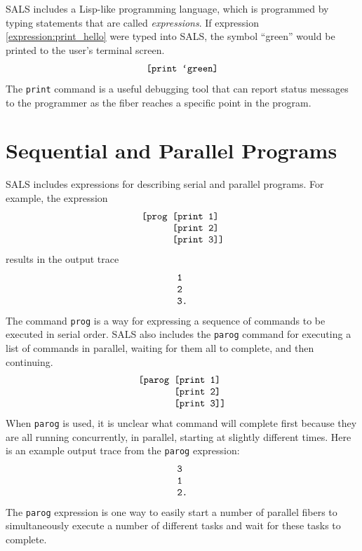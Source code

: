 SALS includes a Lisp-like programming language, which is programmed
by typing statements that are called \emph{expressions}.  If
expression \ref{expression:print_hello} were typed into SALS, the
symbol ``green'' would be printed to the user's terminal screen.
\begin{equation}
\label{expression:print_hello}
\text{\tt [print `green]}
\end{equation}
The {\tt print} command is a useful debugging tool that can report
status messages to the programmer as the fiber reaches a specific
point in the program.

\section{Sequential and Parallel Programs}

SALS includes expressions for describing serial and parallel
programs.  For example, the expression
\begin{equation*}
\begin{array}{l}
\text{\tt [prog [print 1]} \\
\text{\tt ~~~~~~[print 2]} \\
\text{\tt ~~~~~~[print 3]]}
\end{array}
\end{equation*}
results in the output trace
\begin{equation*}
\begin{array}{l}
\text{\tt 1} \\
\text{\tt 2} \\
\text{\tt 3.}
\end{array}
\end{equation*}
The command {\tt prog} is a way for expressing a sequence of commands
to be executed in serial order.  SALS also includes the {\tt parog}
command for executing a list of commands in parallel, waiting for them
all to complete, and then continuing.
\begin{equation*}
\begin{array}{l}
\text{\tt [parog [print 1]} \\
\text{\tt ~~~~~~~[print 2]} \\
\text{\tt ~~~~~~~[print 3]]}
\end{array}
\end{equation*}
When {\tt parog} is used, it is unclear what command will complete
first because they are all running concurrently, in parallel, starting
at slightly different times.  Here is an example output trace from the
{\tt parog} expression:
\begin{equation*}
\begin{array}{l}
\text{\tt 3} \\
\text{\tt 1} \\
\text{\tt 2.}
\end{array}
\end{equation*}
The {\tt parog} expression is one way to easily start a number of
parallel fibers to simultaneously execute a number of different tasks
and wait for these tasks to complete.


